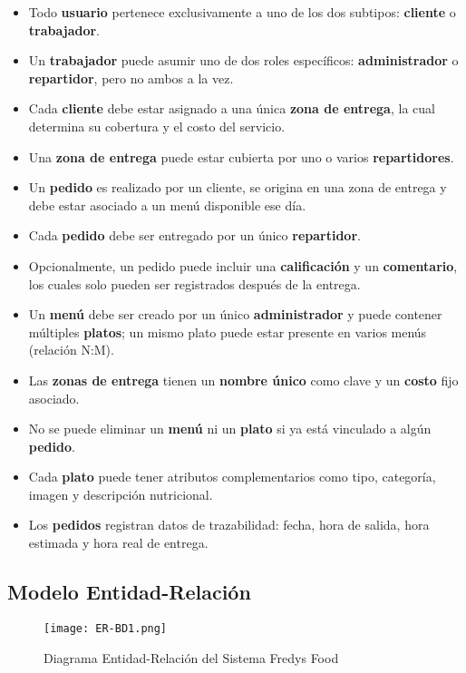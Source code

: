 \documentclass[12pt,a4paper]{article}
\begin{document}
\begin{itemize}
    \item Todo \textbf{usuario} pertenece exclusivamente a uno de los dos subtipos: \textbf{cliente} o \textbf{trabajador}.
    \item Un \textbf{trabajador} puede asumir uno de dos roles específicos: \textbf{administrador} o \textbf{repartidor}, pero no ambos a la vez.
    \item Cada \textbf{cliente} debe estar asignado a una única \textbf{zona de entrega}, la cual determina su cobertura y el costo del servicio.
    \item Una \textbf{zona de entrega} puede estar cubierta por uno o varios \textbf{repartidores}.
    \item Un \textbf{pedido} es realizado por un cliente, se origina en una zona de entrega y debe estar asociado a un menú disponible ese día.
    \item Cada \textbf{pedido} debe ser entregado por un único \textbf{repartidor}.
    \item Opcionalmente, un pedido puede incluir una \textbf{calificación} y un \textbf{comentario}, los cuales solo pueden ser registrados después de la entrega.
    \item Un \textbf{menú} debe ser creado por un único \textbf{administrador} y puede contener múltiples \textbf{platos}; un mismo plato puede estar presente en varios menús (relación N:M).
    \item Las \textbf{zonas de entrega} tienen un \textbf{nombre único} como clave y un \textbf{costo} fijo asociado.
    \item No se puede eliminar un \textbf{menú} ni un \textbf{plato} si ya está vinculado a algún \textbf{pedido}.
    \item Cada \textbf{plato} puede tener atributos complementarios como tipo, categoría, imagen y descripción nutricional.
    \item Los \textbf{pedidos} registran datos de trazabilidad: fecha, hora de salida, hora estimada y hora real de entrega.
\end{itemize}

\subsection{Modelo Entidad-Relación}
\begin{figure}[ht]
  \centering
  \texttt{[image: ER-BD1.png]}
  \caption{Diagrama Entidad-Relación del Sistema Fredys Food}
\end{figure}
\end{document}
